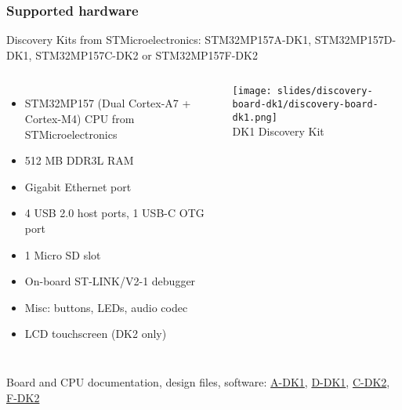 \begin{frame}
\frametitle{Supported hardware}
  Discovery Kits from STMicroelectronics: STM32MP157A-DK1, STM32MP157D-DK1, STM32MP157C-DK2 or STM32MP157F-DK2
  \footnotesize
  \begin{columns}
    \begin{itemize}
    \item STM32MP157 (Dual Cortex-A7 + Cortex-M4) CPU from STMicroelectronics
    \item 512 MB DDR3L RAM
    \item Gigabit Ethernet port
    \item 4 USB 2.0 host ports, 1 USB-C OTG port
    \item 1 Micro SD slot
    \item On-board ST-LINK/V2-1 debugger
    \item Misc: buttons, LEDs, audio codec
    \item LCD touchscreen (DK2 only)
    \end{itemize}
    \begin{center}
    \texttt{[image: slides/discovery-board-dk1/discovery-board-dk1.png]}\\
    DK1 Discovery Kit
    \end{center}
  \end{columns}
  \vspace{0.5em}
  Board and CPU documentation, design files, software:
  \href{https://www.st.com/en/evaluation-tools/stm32mp157a-dk1.html}{A-DK1},
  \href{https://www.st.com/en/evaluation-tools/stm32mp157d-dk1.html}{D-DK1},
  \href{https://www.st.com/en/evaluation-tools/stm32mp157c-dk2.html}{C-DK2},
  \href{https://www.st.com/en/evaluation-tools/stm32mp157f-dk2.html}{F-DK2}
\end{frame}
